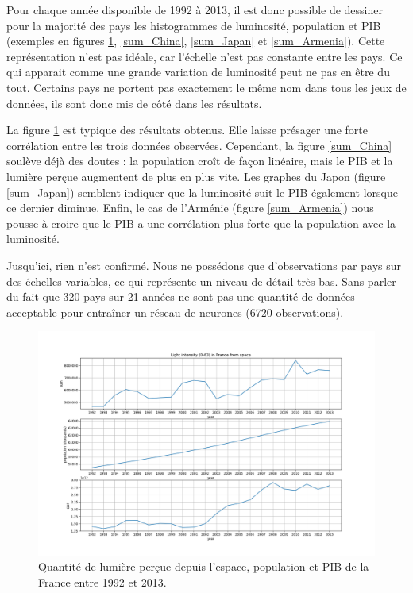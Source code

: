 \documentclass[a4paper, 11pt]{report}
\begin{document}
Pour chaque année disponible de 1992 à 2013, il est donc possible de dessiner pour la majorité des pays les histogrammes de luminosité, population et PIB (exemples en figures \ref{sum_France}, \ref{sum_China}, \ref{sum_Japan} et \ref{sum_Armenia}). Cette représentation n'est pas idéale, car l'échelle n'est pas constante entre les pays. Ce qui apparait comme une grande variation de luminosité peut ne pas en être du tout. Certains pays ne portent pas exactement le même nom dans tous les jeux de données, ils sont donc mis de côté dans les résultats.

La figure \ref{sum_France} est typique des résultats obtenus. Elle laisse présager une forte corrélation entre les trois données observées. Cependant, la figure \ref{sum_China} soulève déjà des doutes : la population croît de façon linéaire, mais le PIB et la lumière perçue augmentent de plus en plus vite. Les graphes du Japon (figure \ref{sum_Japan}) semblent indiquer que la luminosité suit le PIB également lorsque ce dernier diminue. Enfin, le cas de l'Arménie (figure \ref{sum_Armenia}) nous pousse à croire que le PIB a une corrélation plus forte que la population avec la luminosité.

Jusqu'ici, rien n'est confirmé. Nous ne possédons que d'observations par pays sur des échelles variables, ce qui représente un niveau de détail très bas. Sans parler du fait que 320 pays sur 21 années ne sont pas une quantité de données acceptable pour entraîner un réseau de neurones (6720 observations).

\begin{figure}
	\centering
	\includegraphics[width=1.0\textwidth]{img/sum_France.png}
	\caption{Quantité de lumière perçue depuis l'espace, population et PIB de la France entre 1992 et 2013.}
	\label{sum_France}
\end{figure}
\end{document}
